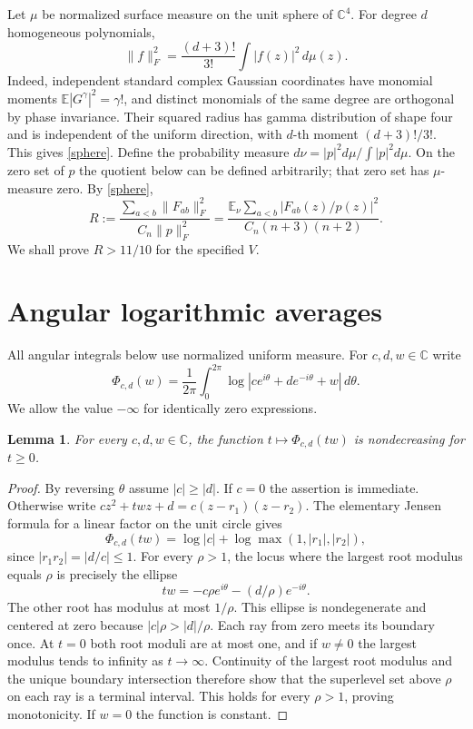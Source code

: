 \documentclass[11pt]{article}
\newtheorem{lemma}{Lemma}
\newcommand{\E}{\mathbb E}
\newcommand{\C}{\mathbb C}
\begin{document}
Let $\mu$ be normalized surface measure on the unit sphere of $\C^4$. For degree $d$ homogeneous polynomials,
\begin{equation}\label{sphere}
 \|f\|_F^2=\frac{(d+3)!}{3!}\int |f(z)|^2\,d\mu(z).
\end{equation}
Indeed, independent standard complex Gaussian coordinates have monomial moments $\E|G^\gamma|^2=\gamma!$, and distinct monomials of the same degree are orthogonal by phase invariance. Their squared radius has gamma distribution of shape four and is independent of the uniform direction, with $d$-th moment $(d+3)!/3!$. This gives \eqref{sphere}.
Define the probability measure $d\nu=|p|^2d\mu/\int|p|^2d\mu$. On the zero set of $p$ the quotient below can be defined arbitrarily; that zero set has $\mu$-measure zero. By \eqref{sphere},
\begin{equation}\label{ratio}
 R:=\frac{\sum_{a<b}\|F_{ab}\|_F^2}{C_n\|p\|_F^2}
 =\frac{\E_\nu\sum_{a<b}|F_{ab}(z)/p(z)|^2}{C_n(n+3)(n+2)}.
\end{equation}
We shall prove $R>11/10$ for the specified $V$.

\section{Angular logarithmic averages}
All angular integrals below use normalized uniform measure. For $c,d,w\in\C$ write
\[
 \Phi_{c,d}(w)=\frac1{2\pi}\int_0^{2\pi}\log|ce^{i\theta}+de^{-i\theta}+w|\,d\theta.
\]
We allow the value $-\infty$ for identically zero expressions.

\begin{lemma}\label{radial}
For every $c,d,w\in\C$, the function $t\mapsto\Phi_{c,d}(tw)$ is nondecreasing for $t\ge0$.
\end{lemma}
\begin{proof}
By reversing $\theta$ assume $|c|\ge|d|$. If $c=0$ the assertion is immediate. Otherwise write $cz^2+twz+d=c(z-r_1)(z-r_2)$. The elementary Jensen formula for a linear factor on the unit circle gives
\[
 \Phi_{c,d}(tw)=\log|c|+\log\max(1,|r_1|,|r_2|),
\]
since $|r_1r_2|=|d/c|\le1$. For every $\rho>1$, the locus where the largest root modulus equals $\rho$ is precisely the ellipse
\[
 tw=-c\rho e^{i\theta}-(d/\rho)e^{-i\theta}.
\]
The other root has modulus at most $1/\rho$. This ellipse is nondegenerate and centered at zero because $|c|\rho>|d|/\rho$. Each ray from zero meets its boundary once. At $t=0$ both root moduli are at most one, and if $w\ne0$ the largest modulus tends to infinity as $t\to\infty$. Continuity of the largest root modulus and the unique boundary intersection therefore show that the superlevel set above $\rho$ on each ray is a terminal interval. This holds for every $\rho>1$, proving monotonicity. If $w=0$ the function is constant.
\end{proof}
\end{document}
